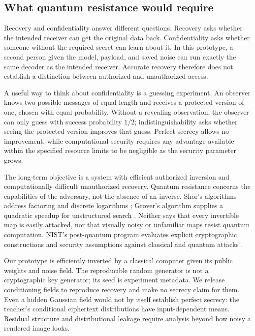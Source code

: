 \documentclass[10pt]{article}
\begin{document}
\subsection{What quantum resistance would require}
Recovery and confidentiality answer different questions. Recovery asks whether
the intended receiver can get the original data back. Confidentiality asks
whether someone without the required secret can learn about it. In this
prototype, a second person given the model, payload, and saved noise can run
exactly the same decoder as the intended receiver. Accurate recovery therefore
does not establish a distinction between authorized and unauthorized access.

A useful way to think about confidentiality is a guessing experiment. An
observer knows two possible messages of equal length and receives a protected
version of one, chosen with equal probability. Without a revealing observation,
the observer can only guess with success probability $1/2$; indistinguishability
asks whether seeing the protected version improves that guess. Perfect secrecy
allows no improvement, while computational security requires any advantage
available within the specified resource limits to be negligible as the security
parameter grows.

The long-term objective is a system with efficient authorized inversion and
computationally difficult unauthorized recovery. Quantum resistance concerns
the capabilities of the adversary, not the absence of an inverse. Shor's
algorithms address factoring and discrete logarithms \cite{shor}; Grover's
algorithm supplies a quadratic speedup for unstructured search \cite{grover}.
Neither says that every invertible map is easily attacked, nor that visually
noisy or unfamiliar maps resist quantum computation. NIST's post-quantum
program evaluates explicit cryptographic constructions and security assumptions
against classical and quantum attacks \cite{nist}.

Our prototype is efficiently inverted by a classical computer given its public
weights and noise field. The reproducible random generator is not a cryptographic
key generator; its seed is experiment metadata. We release conditioning fields
to reproduce recovery and make no secrecy claim for them. Even a hidden Gaussian
field would not by itself establish perfect secrecy: the teacher's conditional
ciphertext distributions have input-dependent means. Residual structure and
distributional leakage require analysis beyond how noisy a rendered image looks.
\end{document}
